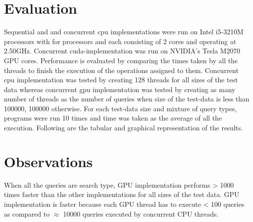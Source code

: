 \documentclass[MTech]{iitmdiss}
\begin{document}
\section{Evaluation}
 Sequential and and concurrent cpu implementations were run on Intel i5-3210M processors with for processors and each consisting of 2 cores and operating at 2.50GHz. Concurrent cuda-implementation was run on NVIDIA's Tesla M2070 GPU cores.
 Performance is evaluated by comparing the times taken by all the threads to finish the execution of the operations assigned to them. Concurrent cpu implementation was tested by creating 128 threads for all sizes of the test data whereas concurrent gpu implementation was tested by creating as many number of threads as the number of queries when size of the test-data is less than 100000, 100000 otherwise. For each test-data size and mixture of query types, programs were run 10 times and time was taken as the average of all the execution. Following are the tabular and graphical representation of the results.
 
 \section{Observations}
When all the queries are search type, GPU implementation performs > 1000 times faster than the other implementations for all sizes of the test data. GPU implementation is faster because each GPU thread has to execute < 100 queries as compared to $\approx$ 10000 queries executed by concurrent CPU threads.
\end{document}
